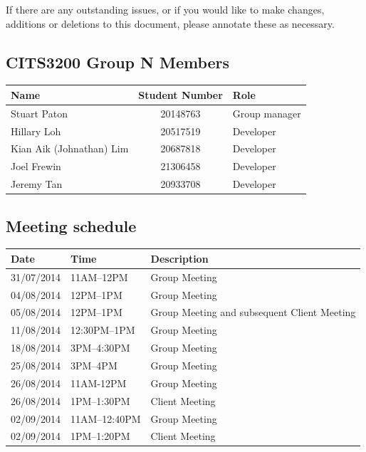 \documentclass[a4paper, 11pt, titlepage]{article}
\begin{document}
If there are any outstanding issues, or if you would like to make changes, additions or deletions to this document, please annotate these as necessary.


\subsection*{CITS3200 Group N Members}
\begin{table}[H]
\centering
\begin{tabular}{lcl}
	\hline
	Name & Student Number & Role \\
	\hline
	Stuart Paton & 20148763  & Group manager\\
	Hillary Loh & 20517519 & Developer\\
	Kian Aik (Johnathan) Lim & 20687818 & Developer \\
	Joel Frewin & 21306458 & Developer\\
	Jeremy Tan & 20933708 & Developer\\
\end{tabular}
\end{table}



\subsection*{Meeting schedule}
\begin{table}[H]
\begin{tabularx}{\textwidth}{lll}
\hline
Date & Time & Description \\
\hline
31/07/2014 & 11AM--12PM & Group Meeting \\
04/08/2014 & 12PM--1PM & Group Meeting \\
05/08/2014 & 12PM--1PM & Group Meeting and subsequent Client Meeting \\
11/08/2014 & 12:30PM--1PM & Group Meeting \\
18/08/2014 & 3PM--4:30PM & Group Meeting \\
25/08/2014 & 3PM--4PM & Group Meeting \\
26/08/2014 & 11AM-12PM & Group Meeting \\
26/08/2014 & 1PM--1:30PM & Client Meeting \\
02/09/2014 & 11AM--12:40PM & Group Meeting \\
02/09/2014 & 1PM--1:20PM & Client Meeting
\end{tabularx}
\end{table}
\end{document}

